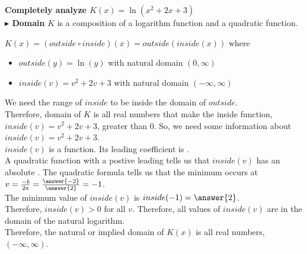 \documentclass{ximera}
\begin{document}
\begin{example}

\textbf{\textcolor{purple!85!blue}{Completely analyze $K(x) = \ln(x^2+2x+3)$}} \\



\textbf{\textcolor{blue!55!black}{$\blacktriangleright$ Domain}}  $K$ is a composition of a logarithm function and a quadratic function. 


$K(x) = (outside \circ inside)(x) = outside(inside(x))$ where


\begin{itemize}
\item $outside(y) = \ln(y)$ with natural domain  $(0, \infty)$ \\
\item $inside(v) = v^2 + 2v + 3$ with natural domain $(-\infty, \infty)$
\end{itemize}


We need the range of $inside$ to be inside the domain of $outside$.\\

Therefore, domain of $K$ is all real numbers that make the inside function, $inside(v)=v^2+2v+3$, greater than $0$.  So, we need some information about $inside(v)=v^2+2v+3$.  \\  


$inside(v)$ is a   function.  Its leading coefficient is . \\


A quadratic function with a postive leading tells us that $inside(v)$ has an absolute .  The quadratic formula tells us that the minimum occurs at $v=\frac{-b}{2a} = \frac{\answer{-2}}{\answer{2}} = -1$. \\

The minimum value of $inside(v)$ is $inside(-1) = \answer{2}$.  \\

Therefore, $inside(v) > 0$ for all $v$. Therefore, all values of $inside(v)$ are in the domain of the natural logarithm. \\

Therefore, the natural or implied domain of $K(x)$ is all real numbers, $(-\infty, \infty)$. \\










\end{example}
\end{document}
